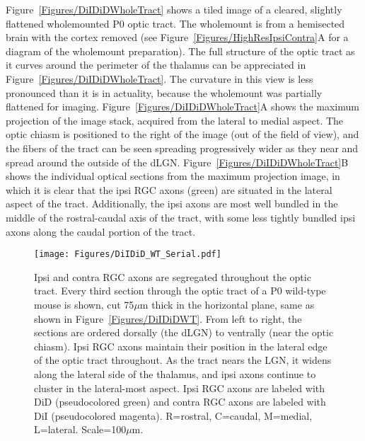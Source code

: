 Figure~\ref{Figures/DiIDiDWholeTract} shows a tiled image of a cleared, slightly flattened wholemounted P0 optic tract.
The wholemount is from a hemisected brain with the cortex removed (see Figure~\ref{Figures/HighResIpsiContra}A for a diagram of the wholemount preparation).
The full structure of the optic tract as it curves around the perimeter of the thalamus can be appreciated in Figure~\ref{Figures/DiIDiDWholeTract}.
The curvature in this view is less pronounced than it is in actuality, because the wholemount was partially flattened for imaging.
Figure~\ref{Figures/DiIDiDWholeTract}A shows the maximum projection of the image stack, acquired from the lateral to medial aspect.
The optic chiasm is positioned to the right of the image (out of the field of view), and the fibers of the tract can be seen spreading progressively wider as they near and spread around the outside of the dLGN.
Figure~\ref{Figures/DiIDiDWholeTract}B shows the individual optical sections from the maximum projection image, in which it is clear that the ipsi RGC axons (green) are situated in the lateral aspect of the tract.
Additionally, the ipsi axons are most well bundled in the middle of the rostral-caudal axis of the tract, with some less tightly bundled ipsi axons along the caudal portion of the tract.
\begin{figure}[hbtp]
    \begin{center}
        \texttt{[image: Figures/DiIDiD\_WT\_Serial.pdf]}
        \caption[Ipsi and contra RGC axons are segregated throughout the optic tract.]
        {Ipsi and contra RGC axons are segregated throughout the optic tract.
        Every third section through the optic tract of a P0 wild-type mouse is shown, cut 75$\mu$m thick in the horizontal plane, same as shown in Figure~\ref{Figures/DiIDiDWT}.
		From left to right, the sections are ordered dorsally (the dLGN) to ventrally (near the optic chiasm).
		Ipsi RGC axons maintain their position in the lateral edge of the optic tract throughout.
        As the tract nears the LGN, it widens along the lateral side of the thalamus, and ipsi axons continue to cluster in the lateral-most aspect.
        Ipsi RGC axons are labeled with DiD (pseudocolored green) and contra RGC axons are labeled with DiI (pseudocolored magenta).
        R=rostral, C=caudal, M=medial, L=lateral.
        Scale=100$\mu$m.}
        \label{Figures/DiIDiDWTSerial}
    \end{center}
\end{figure}
